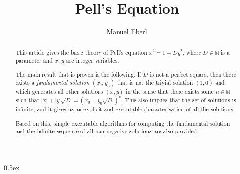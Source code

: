 \documentclass[11pt,a4paper]{article}
\begin{document}
\title{Pell's Equation}
\author{Manuel Eberl}
\maketitle

\begin{abstract}
This article gives the basic theory of Pell's equation $x^2 = 1 + D y^2$, where $D\in\mathbb{N}$ is a parameter and $x$, $y$ are integer variables.

The main result that is proven is the following: If $D$ is not a perfect square, then there exists a \emph{fundamental solution} $(x_0, y_0)$ that is not the trivial solution $(1, 0)$ and which generates all other solutions $(x, y)$ in the sense that there exists some $n\in\mathbb{N}$ such that $|x| + |y| \sqrt{D} = (x_0 + y_0 \sqrt{D})^n$. This also implies that the set of solutions is infinite, and it gives us an explicit and executable characterisation of all the solutions.

Based on this, simple executable algorithms for computing the fundamental solution and the infinite sequence of all non-negative solutions are also provided.
\end{abstract}

\newpage
\tableofcontents
\newpage
\parindent 0pt\parskip 0.5ex





\end{document}
